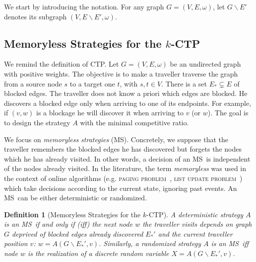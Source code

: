 \documentclass[preprint]{elsarticle}
\newtheorem{definition}{Definition}
\newcommand{\kctp}{$k$-CTP}
\newcommand{\stpath}{$(s,t)$-path}
\newcommand{\mts}{MS}
\begin{document}
We start by introducing the notation. For any graph $G=\left(V,E,\omega\right)$, let $G\backslash E'$ denotes its subgraph $\left(V,E\backslash E',\omega\right)$. 

\subsection{Memoryless Strategies for the \kctp} \label{subsec:msintro}

We remind the definition of CTP. Let $G=\left(V,E,\omega\right)$ be an undirected graph with positive weights. The objective is to make a traveller traverse the graph from a source node $s$ to a target one $t$, with $s,t \in V$. There is a set $E_* \subsetneq E$ of blocked edges. %
The traveller does not know a priori which edges are blocked. He discovers a blocked edge only when arriving to one of its endpoints. For example, if $\left(v,w\right)$ is a blockage he will discover it when arriving to $v$ (or $w$). The goal is to design the strategy $A$ with the minimal competitive ratio.

We focus on \textit{memoryless strategies} (\mts). Concretely, we suppose that the traveller remembers the blocked edges he has discovered but forgets the nodes which he has already visited. In other words, a decision of an \mts ~is independent of the nodes already visited. In the literature, the term \textit{memoryless} was used in the context of online algorithms (e.g. \textsc{paging problem}~\cite{BoEl98}, \textsc{list update problem}~\cite{Al03}) which take decisions according to the current state, ignoring past events. An \mts ~can be either deterministic or randomized.



\begin{definition}[Memoryless Strategies for the \kctp]
A deterministic strategy $A$ is an \mts ~if and only if (iff) the next node $w$ the traveller visits depends on graph $G$ deprived of blocked edges already discovered $E_*'$ and the current traveller position $v$: $w = A\left(G\backslash E_*',v\right)$. Similarly, a randomized strategy $A$ is an \mts ~iff node $w$ is the realization of a discrete random variable $X = A\left(G\backslash E_*',v\right)$.
\end{definition}
\end{document}

